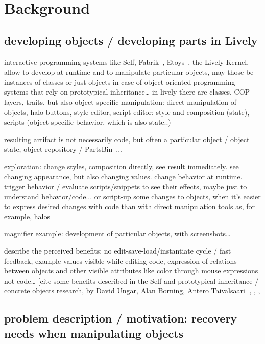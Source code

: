 \section{Background} \label{sec:BACKGROUND}




\subsection{developing objects / developing parts in Lively}

interactive programming systems like Self, Fabrik~\cite{Ingalls1988FVP}, Etoys~\cite{Kay2005Etoys}, the Lively Kernel, allow to develop at runtime and to manipulate particular objects, may those be instances of classes or just objects in case of object-oriented programming systems that rely on prototypical inheritance… in lively there are classes, COP layers, traits, but also object-specific manipulation:
direct manipulation of objects, halo buttons, style editor, script editor: style and composition (state), scripts (object-specific behavior, which is also state..)

resulting artifact is not necessarily code, but often a particular object / object state, object repository / PartsBin~\cite{Lincke2012LPC}...

exploration: change styles, composition directly, see result immediately. see changing appearance, but also changing values. change behavior at runtime. trigger behavior / evaluate scripts/snippets to see their effects, maybe just to understand behavior/code... or script-up some changes to objects, when it’s easier to express desired changes with code than with direct manipulation tools as, for example, halos

magnifier example: development of particular objects, with screenshots…

describe the perceived benefits: no edit-save-load/instantiate cycle / fast feedback, example values visible while editing code, expression of relations between objects and other visible attributes like color through mouse expressions not code… 
[cite some benefits described in the Self and prototypical inheritance / concrete objects research, by David Ungar, Alan Borning, Antero Taivalsaari]
\cite{Taivalsaari1996CVP}, \cite{Tailvalsaari1992Kevo}, \cite{Borning1986CVP}, \cite{Taivalsaari97CVP}


\subsection{problem description / motivation: recovery needs when manipulating objects}

